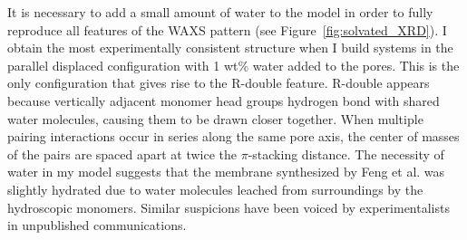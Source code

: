 \documentclass{article}
\begin{document}
  It is necessary to add a small amount of water to the model in order to 
  fully reproduce all features of the WAXS pattern (see Figure~\ref{fig:solvated_XRD}).
  I obtain the most experimentally consistent structure when I build systems
  in the parallel displaced configuration with 1 wt\% water added to the pores. 
  This is the only configuration that gives rise to the R-double feature. R-double
  appears because vertically adjacent monomer head groups hydrogen bond with shared 
  water molecules, causing them to be drawn closer together. When multiple 
  pairing interactions occur in series along the same pore axis, the center
  of masses of the pairs are spaced apart at twice the $\pi$-stacking distance. 
  The necessity of water in my model suggests that the membrane synthesized by
  Feng et al. was slightly hydrated due to water molecules leached from 
  surroundings by the hydroscopic monomers. Similar suspicions have been voiced
  by experimentalists in unpublished communications.
  
\end{document}
